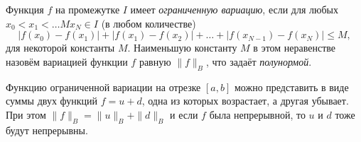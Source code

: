 \begin{to_def}
    Функция $f$ на промежутке $I$ имеет \textit{ограниченную вариацию}, если для любых $x_0 < x_1 < \ldots M x_N \in I$ (в любом количестве)
    \begin{equation*}
        |f(x_0) - f(x_1)| + 
        |f(x_1) - f(x_2)| + \ldots +
        |f(x_{N-1}) - f(x_N)| \leq M,
    \end{equation*}
    для некоторой константы $M$. Наименьшую константу $M$ в этом неравенстве назовём вариацией функции $f$ равную $\|f\|_B$, что задаёт \textit{полунормой}.
\end{to_def}


\begin{to_lem}
    Функцию ограниченной вариации на отрезке $[a, b]$ можно представить в виде суммы двух функций $f = u + d$, одна из которых возрастает, а другая убывает. При этом $\|f\|_B = \|u\|_B + \|d\|_B$ и если $f$ была непрерывной, то $u$ и $d$ тоже будут непрерывны.
\end{to_lem}


